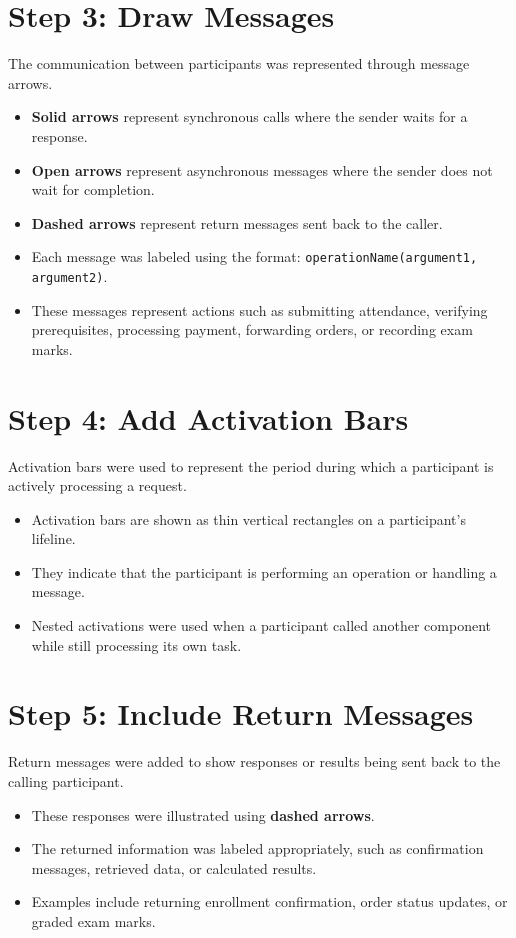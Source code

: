 \section{Step 3: Draw Messages}
The communication between participants was represented through message arrows.

\begin{itemize}
    \item \textbf{Solid arrows} represent synchronous calls where the sender waits for a response.
    \item \textbf{Open arrows} represent asynchronous messages where the sender does not wait for completion.
    \item \textbf{Dashed arrows} represent return messages sent back to the caller.
    \item Each message was labeled using the format: \texttt{operationName(argument1, argument2)}.
    \item These messages represent actions such as submitting attendance, verifying prerequisites, processing payment, forwarding orders, or recording exam marks.
\end{itemize}

\section{Step 4: Add Activation Bars}
Activation bars were used to represent the period during which a participant is actively processing a request.

\begin{itemize}
    \item Activation bars are shown as thin vertical rectangles on a participant’s lifeline.
    \item They indicate that the participant is performing an operation or handling a message.
    \item Nested activations were used when a participant called another component while still processing its own task.
\end{itemize}

\section{Step 5: Include Return Messages}
Return messages were added to show responses or results being sent back to the calling participant.

\begin{itemize}
    \item These responses were illustrated using \textbf{dashed arrows}.
    \item The returned information was labeled appropriately, such as confirmation messages, retrieved data, or calculated results.
    \item Examples include returning enrollment confirmation, order status updates, or graded exam marks.
\end{itemize}

